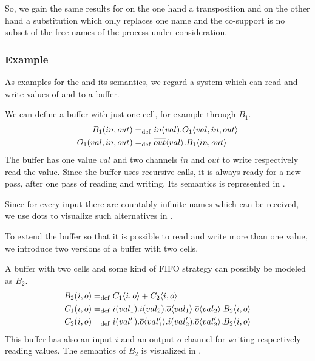 So, we gain the same results for on the one hand a transposition and on the other hand a substitution which only replaces one name and the co-support is no subset of the free names of the process under consideration.\index{\picalc{}|)}


\subsubsection{Example}
\label{sec_exp}
As examples for the \picalc{} and its semantics, we regard a system which can read and write values of and to a buffer.


\begin{example} %
\label{ex_one_cell_buffer}
We can define a buffer with just one cell, for example through $B_1$.
\begin{align*}
	B_1(in,out)&=_{\mathrm{def}}in(val).O_1\langle val,in,out\rangle \\
	O_1(val,in,out)&=_{\mathrm{def}}\overline{out}\langle val\rangle.B_1\langle in,out\rangle
\end{align*}
The buffer has one value $val$ and two channels $in$ and $out$ to write respectively read the value. Since the buffer uses recursive calls, it is always ready for a new pass, after one pass of reading and writing. Its semantics is represented in .
\end{example}

Since for every input there are countably infinite names which can be received, we use dots to visualize such alternatives in .

To extend the buffer so that it is possible to read and write more than one value, we introduce two versions of a buffer with two cells.

\begin{example}
\label{ex_two_cell_buffer_mine}
A buffer with two cells and some kind of FIFO strategy can possibly be modeled as $B_2$.
\begin{align*}
	B_2(i,o)&=_{\mathrm{def}}{C_1\langle i,o\rangle + C_2\langle i,o\rangle}  \\
	C_1(i,o)&=_{\mathrm{def}}i(val_1).i(val_2).\overline{o}\langle val_1\rangle.\overline{o}\langle val_2\rangle.B_2\langle i,o\rangle	\\
	C_2(i,o)&=_{\mathrm{def}}i(val_1').\overline{o}\langle val_1'\rangle.i(val_2').\overline{o}\langle val_2'\rangle.B_2\langle i,o\rangle	
\end{align*}
This buffer has also an input $i$ and an output $o$ channel for writing respectively reading values. The semantics of $B_2$ is visualized in .
\end{example}

